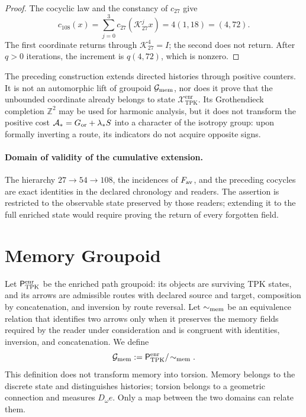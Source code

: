 \begin{proof}
The cocyclic law and the constancy of \(c_{27}\) give
\[
 c_{108}(x)
 =\sum_{j=0}^{3}c_{27}(\mathcal K_{27}^{j}x)
 =4(1,18)=(4,72).
\]
The first coordinate returns through
\(\mathcal K_{27}^{4}=I\); the second does not return. After \(q>0\) iterations,
the increment is \(q(4,72)\), which is nonzero.
\end{proof}

\begin{remark}
The preceding construction extends directed histories through positive
counters. It is not an automorphic lift of groupoid
\(\mathcal G_{\rm mem}\), nor does it prove that the unbounded coordinate already belongs
to state \(\mathcal X_{\mathrm{TPK}}^{\mathrm{enr}}\). Its Grothendieck completion
\(\mathbb Z^2\) may be used for harmonic analysis, but it does not transform
the positive cost
\(\mathcal A_\ast=G_{\rm or}+\lambda_\ast S\) into a character of the isotropy
group: upon formally inverting a route, its indicators do not acquire
opposite signs.
\end{remark}

\paragraph{Domain of validity of the cumulative extension.}
The hierarchy \(27\to54\to108\), the incidences of \(F_{\rm av}\), and the
preceding cocycles are exact identities in the declared chronology and
readers. The assertion is restricted to the observable state preserved by
those readers; extending it to the full enriched state would require
proving the return of every forgotten field.

\section{Memory Groupoid}
\label{sec:grupoide-memoria-tpk}

Let \(\mathsf P_{\rm TPK}^{\rm enr}\) be the enriched path groupoid:
its objects are surviving TPK states, and its arrows are admissible routes
with declared source and target, composition by concatenation, and inversion
by route reversal. Let \(\sim_{\rm mem}\) be an equivalence relation that
identifies two arrows only when it preserves the memory fields required by
the reader under consideration and is congruent with identities, inversion, and
concatenation. We define
\[
 \mathcal G_{\rm mem}
 :=\mathsf P_{\rm TPK}^{\rm enr}/\!\sim_{\rm mem}.
\]
This definition does not transform memory into torsion. Memory belongs to
the discrete state and distinguishes histories; torsion belongs to a
geometric connection and measures \(D_\omega e\). Only a map between the two
domains can relate them.

